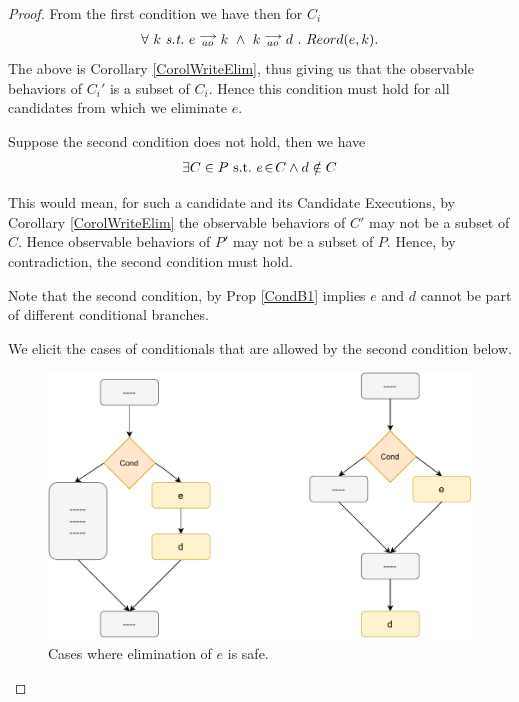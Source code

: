     \begin{proof}
    
        From the first condition we have then for $C_i$
        \begin{align*}
            \forall \ k \ \textit{s.t.} \ 
            \reln{e}{ao}{k} \ \wedge \ \reln{k}{ao}{d} \ . \ 
            Reord(e,k).
        \end{align*}
        The above is Corollary \ref{CorolWriteElim}, thus giving us that the observable behaviors of $C_i'$ is a subset of $C_i$. Hence this condition must hold for all candidates from which we eliminate $e$. 
    
        Suppose the second condition does not hold, then we have 
        \begin{align*}
            \exists C \in P \ \text{s.t.} \  e\!\in\!C \wedge d \notin C
        \end{align*}
    
        This would mean, for such a candidate and its Candidate Executions, by Corollary \ref{CorolWriteElim} the observable behaviors of $C'$ may not be a subset of $C$. 
        Hence observable behaviors of $P'$ may not be a subset of $P$.
        Hence, by contradiction, the second condition must hold. 
    
        Note that the second condition, by Prop \ref{CondB1} implies $e$ and $d$ cannot be part of different conditional branches.
        
        We elicit the cases of conditionals that are allowed by the second condition below.
    
        \begin{figure}[H]
            \centering
            \includegraphics[scale=0.7]{6.Elimination/2.ValidEliminationProgram/Conditionals/ConditionalsCases.pdf}
            \caption{Cases where elimination of $e$ is safe.}
        \end{figure}
    
    \end{proof}
    
